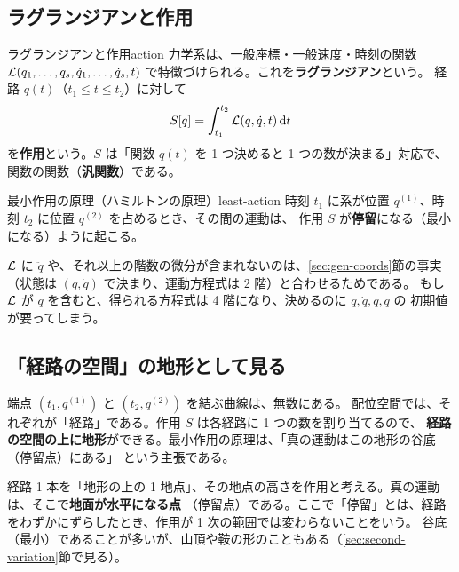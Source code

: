 \subsection{ラグランジアンと作用}

\begin{defn}{ラグランジアンと作用}{action}
力学系は、一般座標・一般速度・時刻の関数 $\mathcal{L}(q_1,\dots,q_s,\dot q_1,\dots,\dot q_s,t)$
で特徴づけられる。これを\textbf{ラグランジアン}という。
経路 $q(t)$（$t_1\le t\le t_2$）に対して
\begin{equation}
  S[q]=\int_{t_1}^{t_2}\mathcal{L}(q,\dot q,t)\,\mathrm{d} t
  \label{eq:action}
\end{equation}
を\textbf{作用}という。$S$ は「関数 $q(t)$ を 1 つ決めると 1 つの数が決まる」対応で、
関数の関数（\textbf{汎関数}）である。
\end{defn}

\begin{principle}{最小作用の原理（ハミルトンの原理）}{least-action}
時刻 $t_1$ に系が位置 $q^{(1)}$、時刻 $t_2$ に位置 $q^{(2)}$ を占めるとき、その間の運動は、
作用 $S$ が\textbf{停留}になる（最小になる）ように起こる。
\end{principle}

$\mathcal{L}$ に $\ddot q$ や、それ以上の階数の微分が含まれないのは、\ref{sec:gen-coords}節の事実
（状態は $(q,\dot q)$ で決まり、運動方程式は 2 階）と合わせるためである。
もし $\mathcal{L}$ が $\ddot q$ を含むと、得られる方程式は 4 階になり、決めるのに $q,\dot q,\ddot q,\dddot q$ の
初期値が要ってしまう。

\subsection{「経路の空間」の地形として見る}

端点 $(t_1,q^{(1)})$ と $(t_2,q^{(2)})$ を結ぶ曲線は、無数にある。
配位空間では、それぞれが「経路」である。作用 $S$ は各経路に 1 つの数を割り当てるので、
\textbf{経路の空間の上に地形}ができる。最小作用の原理は、「真の運動はこの地形の谷底（停留点）にある」
という主張である。

\begin{intuition}
経路 1 本を「地形の上の 1 地点」、その地点の高さを作用と考える。真の運動は、そこで\textbf{地面が水平になる点}
（停留点）である。ここで「停留」とは、経路をわずかにずらしたとき、作用が 1 次の範囲では変わらないことをいう。
谷底（最小）であることが多いが、山頂や鞍の形のこともある（\ref{sec:second-variation}節で見る）。
\end{intuition}

